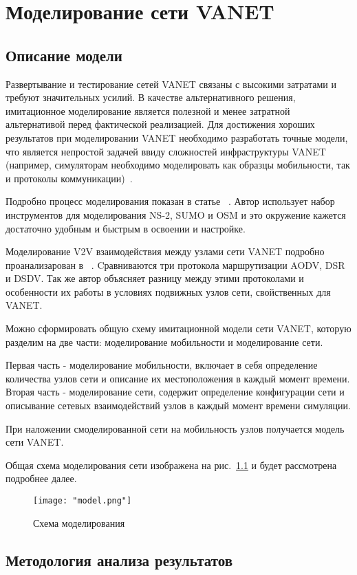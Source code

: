 \chapter{Моделирование сети VANET}

\section{Описание модели}



Развертывание и тестирование сетей VANET связаны с высокими затратами и требуют значительных усилий. В качестве альтернативного решения, имитационное моделирование является полезной и менее затратной альтернативой перед фактической реализацией. Для достижения хороших результатов при моделировании VANET необходимо разработать точные модели, что является непростой задачей ввиду сложностей инфраструктуры VANET (например, симуляторам необходимо моделировать как образцы мобильности, так и протоколы коммуникации)~\cite{kathiriya2013traffic, raj2014simulation, hassan2009vanet}.

Подробно процесс моделирования показан в статье ~\cite{seema2022simulation}. Автор использует набор инструментов для моделирования NS-2, SUMO и OSM и это окружение кажется достаточно удобным и быстрым в освоении и настройке.

Моделирование V2V взаимодействия между узлами сети VANET подробно проанализарован в ~\cite{mahdi2021performance}. Cравниваются три протокола маршрутизации AODV, DSR и DSDV. Так же автор объясняет разницу между этими протоколами и особенности их работы в условиях подвижных узлов сети, свойственных для VANET.

Можно сформировать общую схему имитационной модели сети VANET, которую разделим на две части: моделирование мобильности и моделирование сети.

Первая часть - моделирование мобильности, включает в себя определение количества узлов сети и описание их местоположения в каждый момент времени.
Вторая часть - моделирование сети, содержит определение конфигурации сети и описывание сетевых взаимодействий узлов в каждый момент времени симуляции.

При наложении смоделированной сети на мобильность узлов получается модель сети VANET.

Общая схема моделирования сети изображена на рис.~\ref{fig:model} и будет рассмотрена подробнее далее.

\begin{figure}[!h]
    \centering
    \texttt{[image: "model.png"]}
    \caption{Схема моделирования}
    \label{fig:model}
\end{figure}





\section{Методология анализа результатов}

